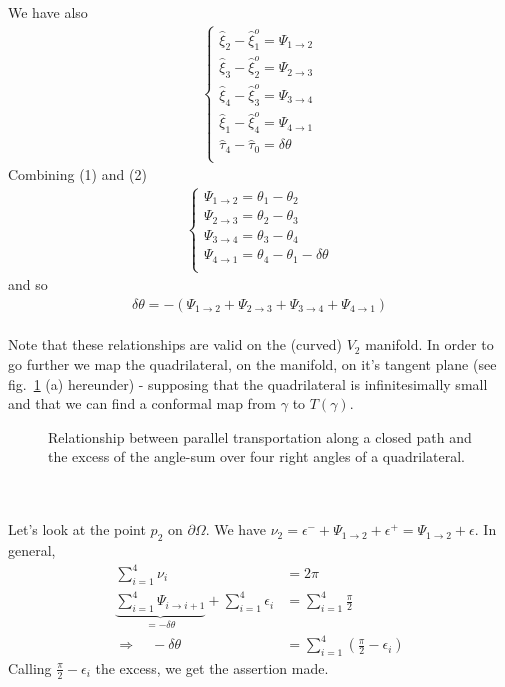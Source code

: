 We have also
\begin{align}
\left \{ \begin{array}{l}
\widehat{\xi}_{2}  - \widehat{\xi}^{o}_{1} = \Psi_{1 \rightarrow 2}\\
\widehat{\xi}_{3}  - \widehat{\xi}^{o}_{2} = \Psi_{2 \rightarrow 3}\\
\widehat{\xi}_{4}  - \widehat{\xi}^{o}_{3} = \Psi_{3 \rightarrow 4}\\
\widehat{\xi}_{1}  - \widehat{\xi}^{o}_{4} = \Psi_{4 \rightarrow 1}\\
\widehat{\tau}_{4}-\widehat{\tau}_{0} = \delta \theta\\ 
\end{array} \right.
\end{align}
Combining (1) and (2)
\begin{align}
\left \{ \begin{array}{l}
\Psi_{1 \rightarrow 2} = \theta_{1}-\theta_{2}\\
\Psi_{2 \rightarrow 3}= \theta_{2}-\theta_{3}\\
\Psi_{3 \rightarrow 4}= \theta_{3}-\theta_{4}\\
\Psi_{4 \rightarrow 1}= \theta_{4}-\theta_{1}- \delta \theta\\
\end{array} \right.
\end{align}
and so 
\begin{align}
\delta \theta = -(\Psi_{1 \rightarrow 2}+\Psi_{2 \rightarrow 3}+\Psi_{3 \rightarrow 4}+\Psi_{4 \rightarrow 1})
\end{align}\\
Note that these relationships are valid on the (curved) $V_{2}$ manifold. In order to go further we map the quadrilateral, on the manifold, on it's tangent plane (see fig.~\ref{fig:fig_p96_3415_d} (a) hereunder) - supposing that the quadrilateral is infinitesimally small and that we can find a conformal map from $\gamma$ to $T(\gamma)$.
\begin{figure}[h]%
    \centering
    \subfloat[]{}
	\qquad
    \subfloat[]{}
\caption{Relationship between parallel transportation along a closed path and the excess of the angle-sum over four right angles of a quadrilateral.}
\label{fig:fig_p96_3415_d}
\end{figure}\\
\\ Let's look at the point $p_2$ on $\partial \Omega$. We have $\nu_2 = \epsilon^{-}+\Psi_{1 \rightarrow 2} +\epsilon^{+}= \Psi_{1 \rightarrow 2}+\epsilon$. In general,
\begin{align}
\sum_{i=1}^{4} \nu_i &= 2\pi \\
\underbrace{\sum_{i=1}^{4} \Psi_{i \rightarrow i+1}}_{= - \delta \theta} +\sum_{i=1}^{4} \epsilon_{i} &= \sum_{i=1}^{4} \frac{\pi}{2} \\
\Rightarrow \quad - \delta \theta &= \sum_{i=1}^{4}(\frac{\pi}{2} - \epsilon _{i})
\end{align}
Calling $\frac{\pi}{2} - \epsilon _{i}$ the excess, we get the assertion made.

